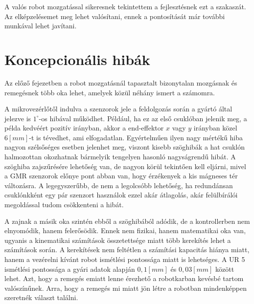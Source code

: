 A valós robot mozgatással sikeresnek tekintettem a fejlesztésnek ezt a szakaszát. Az elképzelésemet meg lehet valósítani, ennek a pontosítását már további munkával lehet javítani. 

\section{Koncepcionális hibák}

Az előző fejezetben a robot mozgatásnál tapasztalt bizonytalan mozgásnak és remegésnek több oka lehet, amelyek közül néhány ismert a számomra.

A mikrovezérlőtől indulva a szenzorok jele a feldolgozás során a gyártó által jelezve is $1^\circ$-os hibával működhet. Például, ha ez az első csuklóban jelenik meg, a példa kedvéért pozitív irányban, akkor a end-effektor $x$ vagy $y$ irányban közel $6[mm]$-t is tévedhet, ami elfogadatlan. Egyértelműen ilyen nagy mértékű hiba nagyon szélsőséges esetben jelenhet meg, viszont kisebb szöghibák a hat csuklón halmozottan okozhatnak bármelyik tengelyen hasonló nagyságrendű hibát. A szöghiba zajszűrésére lehetőség van, de nagyon körül tekintően kell eljárni, mivel a GMR szenzorok előnye pont abban van, hogy érzékenyek a kis mágneses tér változásra. A legegyszerűbb, de nem a legolcsóbb lehetőség, ha redundánsan csuklónkként egy pár szenzort használok ezzel akár átlagolás, akár felülbírálói megoldással tudom csökkenteni a hibát.

A zajnak a másik oka szintén ebből a szöghibából adódik, de a kontrollerben nem elnyomódik, hanem felerősödik. Ennek nem fizikai, hanem matematikai oka van, ugyanis a kinematikai számítások összetettsége miatt több kerekítés lehet a számítások során. A kerekítések nem feltétlen a számítási kapacitás hiánya miatt, hanem a vezérelni kívánt robot ismétlési pontossága miatt is lehetséges. A UR 5 ismétlési pontossága a gyári adatok alapján $0,1[mm]$ és $0,03[mm]$ között lehet. Azt, hogy a remegés emiatt lenne érezhető a robotkarban kevésbé tartom valószínűnek. Arra, hogy a remegés mi miatt jön létre a robotban mindenképpen szeretnék választ találni.
